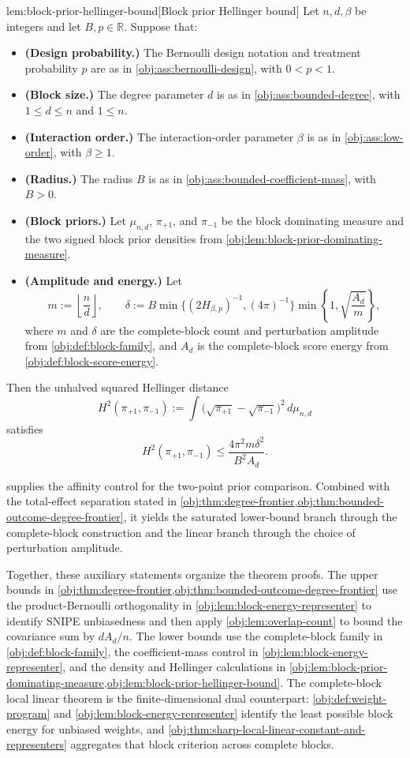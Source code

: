 \begin{lemmav}{lem:block-prior-hellinger-bound}[Block prior Hellinger bound]
Let \(n,d,\beta\) be integers and let \(B,p\in\mathbb R\). Suppose that:
\begin{itemize}
\item \textbf{(Design probability.)} The Bernoulli design notation and treatment probability \(p\) are as in \cref{obj:ass:bernoulli-design}, with \(0<p<1\).
\item \textbf{(Block size.)} The degree parameter \(d\) is as in \cref{obj:ass:bounded-degree}, with \(1\le d\le n\) and \(1\le n\).
\item \textbf{(Interaction order.)} The interaction-order parameter \(\beta\) is as in \cref{obj:ass:low-order}, with \(\beta\ge1\).
\item \textbf{(Radius.)} The radius \(B\) is as in \cref{obj:ass:bounded-coefficient-mass}, with \(B>0\).
\item \textbf{(Block priors.)} Let \(\mu_{n,d}\), \(\pi_{+1}\), and \(\pi_{-1}\) be the block dominating measure and the two signed block prior densities from \cref{obj:lem:block-prior-dominating-measure}.
\item \textbf{(Amplitude and energy.)} Let
\[
m:=\left\lfloor\frac nd\right\rfloor,
\qquad
\delta
:=B\min\{(2H_{\beta,p})^{-1},(4\pi)^{-1}\}
  \min\left\{1,\sqrt{\frac{A_d}{m}}\right\},
\]
where \(m\) and \(\delta\) are the complete-block count and perturbation amplitude from \cref{obj:def:block-family}, and \(A_d\) is the complete-block score energy from \cref{obj:def:block-score-energy}.
\end{itemize}
Then the unhalved squared Hellinger distance
\[
H^2(\pi_{+1},\pi_{-1})
:=\int\bigl(\sqrt{\pi_{+1}}-\sqrt{\pi_{-1}}\bigr)^2\,d\mu_{n,d}
\]
satisfies
\[
H^2(\pi_{+1},\pi_{-1})
\le
\frac{4\pi^2m\delta^2}{B^2A_d}.
\]
\end{lemmav}

 supplies the affinity control for the two-point prior comparison. Combined with the total-effect separation stated in \cref{obj:thm:degree-frontier,obj:thm:bounded-outcome-degree-frontier}, it yields the saturated lower-bound branch through the complete-block construction and the linear branch through the choice of perturbation amplitude.

Together, these auxiliary statements organize the theorem proofs. The upper bounds in \cref{obj:thm:degree-frontier,obj:thm:bounded-outcome-degree-frontier} use the product-Bernoulli orthogonality in \cref{obj:lem:block-energy-representer} to identify SNIPE unbiasedness and then apply \cref{obj:lem:overlap-count} to bound the covariance sum by \(dA_d/n\). The lower bounds use the complete-block family in \cref{obj:def:block-family}, the coefficient-mass control in \cref{obj:lem:block-energy-representer}, and the density and Hellinger calculations in \cref{obj:lem:block-prior-dominating-measure,obj:lem:block-prior-hellinger-bound}. The complete-block local linear theorem is the finite-dimensional dual counterpart: \cref{obj:def:weight-program} and \cref{obj:lem:block-energy-representer} identify the least possible block energy for unbiased weights, and \cref{obj:thm:sharp-local-linear-constant-and-representers} aggregates that block criterion across complete blocks.
